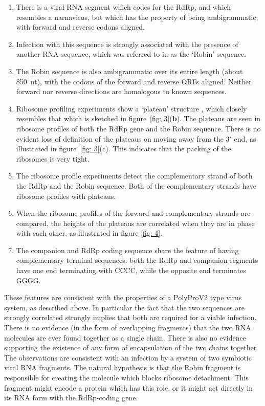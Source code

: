 \documentclass[12pt]{iopart}
\begin{document}
\begin{enumerate}

\item There is a viral RNA segment which codes for the RdRp, and which resembles 
a narnavirus, but which has the property of being ambigrammatic, with forward and reverse codons 
aligned.  

\item Infection with this sequence is strongly associated with the presence of another RNA 
sequence, which was referred to in \cite{Bat+20} as the \lq Robin' sequence. 

\item The Robin sequence is also ambigrammatic over its entire length (about 850~nt), with the codons of the 
forward and reverse ORFs aligned. Neither forward nor reverse directions are homologous to known sequences.

\item Ribosome profiling experiments show a \lq plateau' structure
\cite{Ret+20}, which closely resembles that which is sketched in
figure~\ref{fig: 3}({\bf b}). The plateaus are seen in ribosome profiles of
both the RdRp gene and the Robin sequence. There is no evident loss of
definition of the plateaus on moving away from the $3'$ end, as illustrated in
figure~\ref{fig: 3}(c). This indicates that the packing of the ribosomes is
very tight.

\item The ribosome profile experiments detect the complementary strand of both the RdRp and the Robin sequence.
Both of the complementary strands have ribosome profiles with plateaus.

\item When the ribosome profiles of the forward and complementary strands are compared, the heights 
of the plateaus are correlated when they are in phase with each other, as illustrated 
in figure \ref{fig: 4}.

\item The companion and RdRp coding sequence share the feature of having complementary 
terminal sequences: both the RdRp and companion segments have one end terminating with CCCC, 
while the opposite end terminates GGGG.
 
\end{enumerate}

These features are consistent with the properties of a PolyProV2 type virus system, as described above.
In particular the fact that the two sequences are strongly correlated strongly implies that 
both are required for a viable infection. There is no evidence (in the form of 
overlapping fragments) that the two RNA molecules are 
ever found together as a single chain. There is also no evidence supporting the existence 
of any form of encapsulation of the two chains together. 
The observations are consistent with an infection by a system of two symbiotic viral RNA 
fragments. The natural hypothesis is that the Robin fragment is responsible for creating the 
molecule which blocks ribosome detachment. This fragment might encode a protein which has 
this role, or it might act directly in its RNA form with the RdRp-coding gene.
\end{document}

